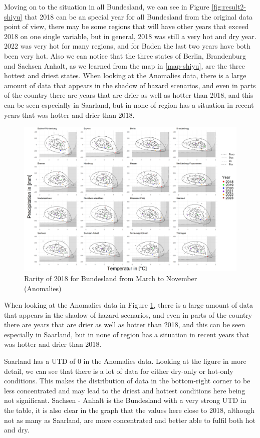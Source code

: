 \documentclass[
]{krantz}
\begin{document}
Moving on to the situation in all Bundesland, we can see in Figure \ref{fig:result2-shiyu} that 2018 can be an special year for all Bundesland from the original data point of view, there may be some regions that will have other years that exceed 2018 on one single variable, but in general, 2018 was still a very hot and dry year. 2022 was very hot for many regions, and for Baden the last two years have both been very hot. Also we can notice that the three states of Berlin, Brandenburg and Sachsen Anhalt, as we learned from the map in \ref{map-shiyu}, are the three hottest and driest states.
When looking at the Anomalies data, there is a large amount of data that appears in the shadow of hazard scenarios, and even in parts of the country there are years that are drier as well as hotter than 2018, and this can be seen especially in Saarland, but in none of region has a situation in recent years that was hotter and drier than 2018.

\begin{figure}

{\centering \includegraphics[width=0.8\linewidth]{work/03-compounds/figures/RESULTS/resultMtoNA} 

}

\caption{Rarity of 2018 for Bundesland from March to November (Anomalies)}\label{fig:result3-shiyu}
\end{figure}

When looking at the Anomalies data in Figure \ref{fig:result3-shiyu}, there is a large amount of data that appears in the shadow of hazard scenarios, and even in parts of the country there are years that are drier as well as hotter than 2018, and this can be seen especially in Saarland, but in none of region has a situation in recent years that was hotter and drier than 2018.

Saarland has a UTD of 0 in the Anomalies data. Looking at the figure in more detail, we can see that there is a lot of data for either dry-only or hot-only conditions. This makes the distribution of data in the bottom-right corner to be less concentrated and may lead to the driest and hottest conditions here being not significant. Sachsen - Anhalt is the Bundesland with a very strong UTD in the table, it is also clear in the graph that the values here close to 2018, although not as many as Saarland, are more concentrated and better able to fulfil both hot and dry.
\end{document}
